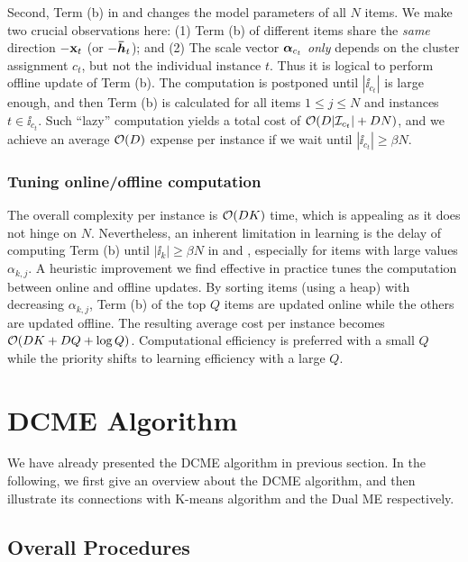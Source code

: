 Second, Term (b) in  and
 changes the model parameters of all $N$ items.
We make two crucial observations here: (1) Term (b) of different items share the
\emph{same} direction $-\mathbf{x}_t$ (or $-\boldsymbol{\bar{h}}_t$); and (2) The scale vector
$\boldsymbol{\alpha}_{c_t}$ \emph{only} depends on the cluster assignment $c_t$, but not the
individual instance $t$. Thus it is logical to perform offline update of Term
(b). The computation is postponed until $|\ii_{c_t}|$ is large enough, and then
Term (b) is calculated for all items $1 \le j \le N$ and instances $t \in
\ii_{c_t}$. Such ``lazy'' computation yields a total cost of $\mathcal{O}(D |\mathcal{I}_{c_t}|
+ D N)$, and we achieve an average $\mathcal{O}(D)$ expense per instance if we wait
until $|\ii_{c_t}| \ge \beta N$.

\subsubsection{Tuning online/offline computation}

The overall complexity per instance is $\mathcal{O}(DK)$ time, which is appealing as it
does not hinge on $N$.  Nevertheless, an inherent limitation in learning is the
delay of computing Term (b) until $|\ii_k| \ge \beta N$ in
 and  ,
especially for items with large values $\alpha_{k, j}$. A heuristic improvement
we find effective in practice tunes the computation between online and offline
updates. By sorting items (using a heap) with decreasing $\alpha_{k,j}$, Term
(b) of the top $Q$ items are updated online while the others are updated
offline. The resulting average cost per instance becomes $\mathcal{O}(D K + D Q + \log
Q)$. Computational efficiency is preferred with a small $Q$ while the priority
shifts to learning efficiency with a large $Q$.

\section{DCME Algorithm}\label{sec::dcme_algo}

We have already presented the DCME algorithm in previous section. In the
following, we first give an overview about the DCME algorithm, and then
illustrate its connections with K-means algorithm and the Dual ME respectively.

\subsection{Overall Procedures}

